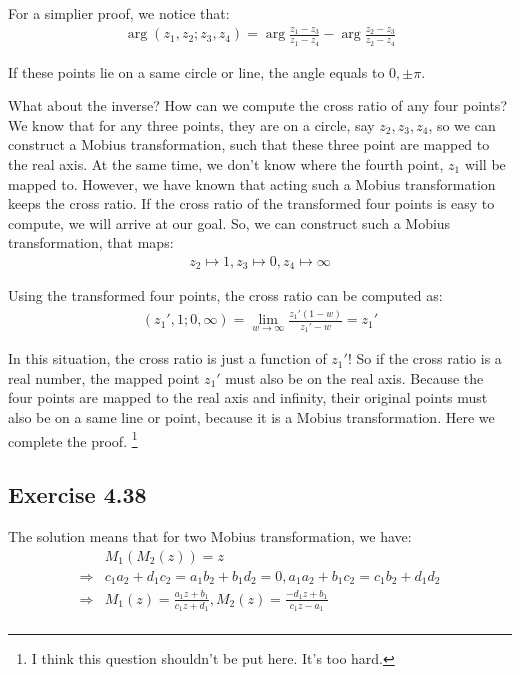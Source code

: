 \documentclass[]{ctexart}
\begin{document}
			For a simplier proof, we notice that:
				\begin{equation*}
				\begin{aligned}
					\arg(z_1,z_2;z_3,z_4)=\arg\frac{z_1-z_3}{z_1-z_4}-\arg\frac{z_2-z_3}{z_2-z_4}
				\end{aligned}
				\end{equation*}
				
			If these points lie on a same circle or line, the angle equals to $0,\pm \pi$. 
			
			What about the inverse? How can we compute the cross ratio of any four points? We know that for any three points, they are on a circle, say $z_2,z_3,z_4$, so we can construct a Mobius transformation, such that these three point are mapped to the real axis. At the same time, we don't know where the fourth point, $z_1$ will be mapped to. However, we have known that acting such a Mobius transformation keeps the cross ratio. If the cross ratio of the transformed four points is easy to compute, we will arrive at our goal. So, we can construct such a Mobius transformation, that maps:
				\begin{equation*}
				\begin{aligned}
					z_2\mapsto 1,z_3\mapsto 0,z_4\mapsto \infty
				\end{aligned}
				\end{equation*}
				
			Using the transformed four points, the cross ratio can be computed as:
				\begin{equation*}
				\begin{aligned}
					(z_1',1;0,\infty)=\lim_{w\rightarrow \infty}\frac{z_1'(1-w)}{z_1'-w}=z_1'
				\end{aligned}
				\end{equation*}
			
			In this situation, the cross ratio is just a function of $z_1'$! So if the cross ratio is a real number, the mapped point $z_1'$ must also be on the real axis. Because the four points are mapped to the real axis and infinity, their original points must also be on a same line or point, because it is a Mobius transformation. Here we complete the proof. 
			\footnote{I think this question shouldn't be put here. It's too hard. }
			
	\subsection{Exercise 4.38}
		The solution means that for two Mobius transformation, we have:
			\begin{equation*}
			\begin{aligned}
			 	&M_1(M_2(z))=z\\
				\Rightarrow &c_1a_2+d_1c_2=a_1b_2+b_1d_2=0,a_1a_2+b_1c_2=c_1b_2+d_1d_2\\
		 		\Rightarrow &M_1(z)=\frac{a_1z+b_1}{c_1z+d_1},M_2(z)=\frac{-d_1z+b_1}{c_1z-a_1}\\
			\end{aligned}
			\end{equation*}
		
\end{document}
